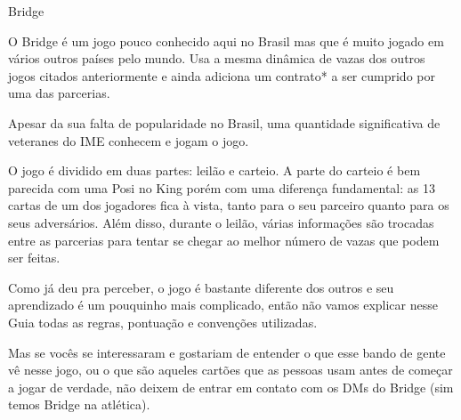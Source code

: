 \begin{subsecao}{Bridge}

O Bridge é um jogo pouco conhecido aqui no Brasil mas que é muito jogado em
vários outros países pelo mundo. Usa a mesma dinâmica de vazas dos outros jogos
citados anteriormente e ainda adiciona um contrato* a ser cumprido por uma das
parcerias.

Apesar da sua falta de popularidade no Brasil, uma quantidade significativa de 
veteranes do IME conhecem e jogam o jogo.

O jogo é dividido em duas partes: leilão e carteio. A parte do carteio é bem
parecida com uma Posi no King porém com uma diferença fundamental: as 13 cartas
de um dos jogadores fica à vista, tanto para o seu parceiro quanto para os seus
adversários. Além disso, durante o leilão, várias informações são trocadas entre
as parcerias para tentar se chegar ao melhor número de vazas que podem ser
feitas.

Como já deu pra perceber, o jogo é bastante diferente dos outros e seu
aprendizado é um pouquinho mais complicado, então não vamos explicar nesse Guia
todas as regras, pontuação e convenções utilizadas.

Mas se vocês se interessaram e gostariam de entender o que esse bando de
gente vê nesse jogo, ou o que são aqueles cartões que as pessoas usam antes de
começar a jogar de verdade, não deixem de entrar em contato com os DMs do Bridge (sim temos Bridge na atlética).

\end{subsecao}
